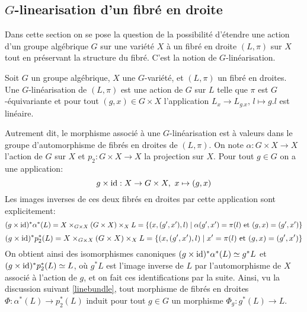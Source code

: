 \subsection{$G$-linearisation d'un fibré en droite}

Dans cette section on se pose la question de la possibilité d'étendre une action d'un groupe algébrique $G$ sur une variété $X$ à un fibré en droite $(L,\pi)$ sur $X$ tout en préservant la structure du fibré. C'est la notion de $G$-linéarisation. 

\begin{defn}
Soit $G$ un groupe algébrique, $X$ une $G$-variété, et $(L,\pi)$ un fibré en droites. Une $G$-linéarisation de  $(L,\pi)$ est une action de $G$ sur $L$ telle que $\pi$ est $G$-équivariante et pour tout $(g,x)\in G\times X$ l'application $L_x\rightarrow L_{g.x},\, l\mapsto g.l$ est linéaire.
\end{defn}

Autrement dit, le morphisme associé à une $G$-linéarisation est à valeurs dans le groupe d'automorphisme de fibrés en droites de $(L,\pi)$. On note $\alpha: G\times X\rightarrow X$ l'action de $G$ sur $X$ et $p_2:G\times X\rightarrow X$ la projection sur $X$. Pour tout $g\in G$ on a une application:
$$g\times \operatorname{id}: X\rightarrow G\times X,\,\, x\mapsto (g,x)$$ 
Les images inverses de ces deux fibrés en droites par cette application sont explicitement: 
$$(g\times \operatorname{id})^*\alpha^*(L)=X\times_{G\times X}(G\times X)\times_X L=\lbrace (x,(g',x'),l)\mid \alpha(g',x')=\pi(l)\text{ et } (g,x)=(g',x')\rbrace$$
$$(g\times \operatorname{id})^*p_2^*(L)=X\times_{G\times X}(G\times X)\times_X L=\lbrace (x,(g',x'),l)\mid x'=\pi(l)\text{ et } (g,x)=(g',x')\rbrace$$
On obtient ainsi des isomorphismes canoniques $(g\times \operatorname{id})^*\alpha^*(L)\simeq g^*L$ et $(g\times \operatorname{id})^*p_2^*(L)\simeq L$, où $g^*L$ est l'image inverse de $L$ par l'automorphisme de $X$ associé à l'action de $g$, et on fait ces identifications par la suite. Ainsi, vu la discussion suivant \ref{linebundle}, tout morphisme de fibrés en droites $\Phi: \alpha^*(L)\rightarrow p_2^*(L)$ induit pour tout $g\in G$ un morphisme $\Phi_g:g^*(L)\rightarrow L$.

